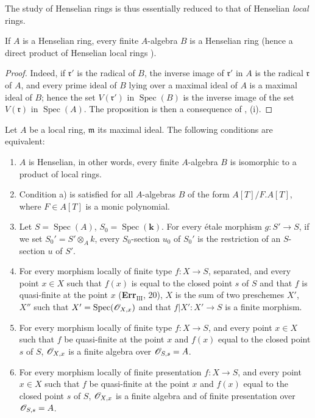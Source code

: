The study of Henselian rings is thus essentially reduced to that of Henselian \emph{local} rings.

\begin{proposition}[18.5.10]
\label{IV.18.5.10}
If $A$ is a Henselian ring, every finite $A$-algebra $B$ is a Henselian ring \textup{(hence} a direct product of Henselian local rings \textup{)}.
\end{proposition}

\begin{proof}
Indeed, if $\mathfrak{r}'$ is the radical of $B$, the inverse image of $\mathfrak{r}'$ in $A$ is the radical $\mathfrak{r}$ of $A$, and every prime ideal of $B$ lying over a maximal ideal of $A$ is a maximal ideal of $B$;
hence the set $V(\mathfrak{r}')$ in $\operatorname{Spec}(B)$ is the inverse image of the set $V(\mathfrak{r})$ in $\operatorname{Spec}(A)$.
The proposition is then a consequence of , (i).
\end{proof}

\begin{theorem}[18.5.11]
\label{IV.18.5.11}
Let $A$ be a local ring, $\mathfrak{m}$ its maximal ideal.
The following conditions are equivalent:
\begin{enumerate}[label=\emph{\alph*)}]
  \item $A$ is Henselian, in other words, every finite $A$-algebra $B$ is isomorphic to a product of local rings.
  \item[\textup{a$'$)}] Condition \textup{a)} is satisfied for all $A$-algebras $B$ of the form $A[T]/F.A[T]$, where $F\in A[T]$ is a monic polynomial.
  \item Let $S=\operatorname{Spec}(A)$, $S_0=\operatorname{Spec}(\boldsymbol{k})$.
For every \'etale morphism $g:S'\to S$, if we set $S_0'=S'\otimes_A k$, every $S_0$-section $u_0$ of $S_0'$ is the restriction of an $S$-section $u$ of $S'$.
  \item For every morphism locally of finite type $f:X\to S$, separated, and every point $x\in X$ such that $f(x)$ is equal to the closed point $s$ of $S$ and that $f$ is quasi-finite at the point $x$ \textup{(\textbf{Err}$_{\mathrm{III}}$, 20)}, $X$ is the sum of two preschemes $X'$, $X''$ such that $X'=\operatorname{Spec}(\mathscr{O}_{X,x})$ and that $f|X':X'\to S$ is a \textup{finite} morphism.
  \item[\textup{c$'$)}] For every morphism locally of finite type $f:X\to S$, and every point $x\in X$ such that $f$ be quasi-finite at the point $x$ and $f(x)$ equal to the closed point $s$ of $S$, $\mathscr{O}_{X,x}$ is a finite algebra over $\mathscr{O}_{S,s}=A$.
  \item[\textup{c$''$)}] For every morphism locally of finite presentation $f:X\to S$, and every point $x\in X$ such that $f$ be quasi-finite at the point $x$ and $f(x)$ equal to the closed point $s$ of $S$, $\mathscr{O}_{X,x}$ is a finite algebra and of finite presentation over $\mathscr{O}_{S,s}=A$.
\end{enumerate}
\end{theorem}


